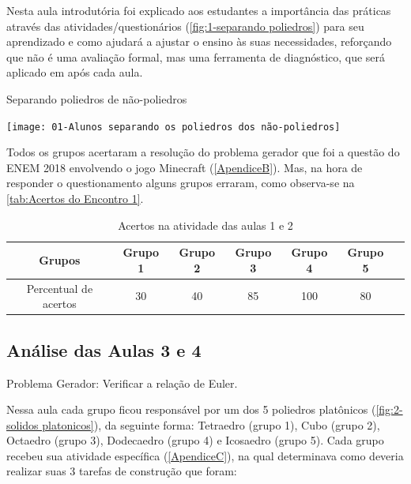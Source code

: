 Nesta aula introdutória foi explicado aos estudantes a importância das práticas através das atividades/questionários (\autoref{fig:1-separando poliedros}) para seu aprendizado e como ajudará a ajustar o ensino às suas necessidades, reforçando que não é uma avaliação formal, mas uma ferramenta de diagnóstico, que será aplicado em após cada aula.

\begin{CenteredFigure}
    \caption{Separando poliedros de não-poliedros} \label{fig:1-separando poliedros}
    \texttt{[image: 01-Alunos separando os poliedros dos não-poliedros]}
    \legend{\autoria}
\end{CenteredFigure}

Todos os grupos acertaram a resolução do problema gerador que foi a questão do ENEM 2018 envolvendo o jogo Minecraft (\autoref{ApendiceB}). Mas, na hora de responder o questionamento alguns grupos erraram, como observa-se na \autoref{tab:Acertos do Encontro 1}.

\begin{table}[htbp] \centering
    \caption{Acertos na atividade das aulas 1 e 2} \label{tab:Acertos do Encontro 1}
    \begin{tabular}{|c|c|c|c|c|c|c|}
        \hline
        \textbf{Grupos}       & \textbf{Grupo 1} & \textbf{Grupo 2} & \textbf{Grupo 3} & \textbf{Grupo 4} & \textbf{Grupo 5} \\
        \hline
        Percentual de acertos & 30               & 40               & 85               & 100              & 80               \\
        \hline
    \end{tabular}
    \legend{\legendaTabela}
\end{table}

\subsection{Análise das Aulas 3 e 4}

Problema Gerador: Verificar a relação de Euler.

Nessa aula cada grupo ficou responsável por um dos 5 poliedros platônicos (\autoref{fig:2-solidos platonicos}), da seguinte forma:  Tetraedro (grupo 1), Cubo (grupo 2), Octaedro (grupo 3), Dodecaedro  (grupo 4) e Icosaedro (grupo 5). Cada grupo recebeu sua atividade específica (\autoref{ApendiceC}), na qual determinava como deveria realizar suas 3 tarefas de construção que foram:

